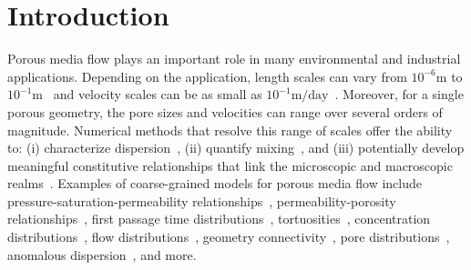 \documentclass[preprint,10pt]{elsarticle}
\begin{document}
\section{Introduction}
\label{sec:intro}
Porous media flow plays an important role in many environmental and
industrial applications.  Depending on the application, length scales
can vary from $10^{-6}\mathrm{m}$ to
$10^{-1}\mathrm{m}$~\cite{mil-chr-imh-mcb-ped1998} and velocity scales
can be as small as $10^{-1}\mathrm{m/day}$~\cite{kut-scr-dav-ham1995}.
Moreover, for a single porous geometry, the pore sizes and velocities
can range over several orders of magnitude.  Numerical methods that
resolve this range of scales offer the ability to: (i) characterize
dispersion~\cite{saf1959}, (ii) quantify
mixing~\cite{leb-den-dav-bol-car-dec-bou2011, den-leb-eng-bij2011}, and
(iii) potentially develop meaningful constitutive relationships that
link the microscopic and macroscopic
realms~\cite{mil-chr-imh-mcb-ped1998}.  Examples of coarse-grained
models for porous media flow include pressure-saturation-permeability
relationships~\cite{mil-chr-imh-mcb-ped1998}, permeability-porosity
relationships~\cite{dar-mcc1998, car1937, won-kop-tom1984}, first
passage time distributions~\cite{ber-sch-sil2000, hym-den-hag-kan2019,
cve-che-wen1996}, tortuosities~\cite{hak-com-den2019, mat-kha-koz2008,
dud-koz-mat2011, kop-kat-tim1996}, concentration
distributions~\cite{ica-den2019, bel-sal-rin1992}, flow
distributions~\cite{ali-par-wei-bre2017}, geometry
connectivity~\cite{knu-car2005, wes-blo-gra2001}, pore
distributions~\cite{ali-par-wei-bre2017}, anomalous
dispersion~\cite{dea-qua-bir-jua2018, den-cor-sch-ber2004,
sie-ili-pri-riv-gua2019}, and more.  
\end{document}
